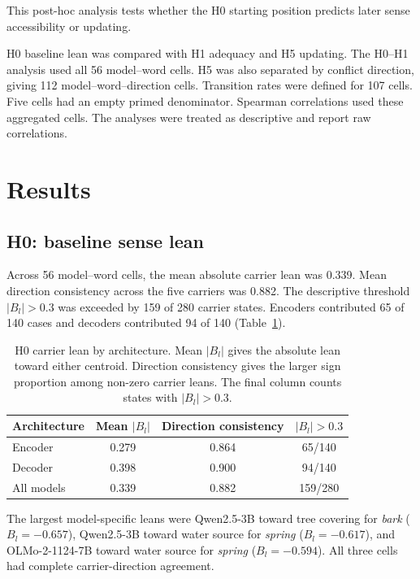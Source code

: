 \documentclass[conference]{IEEEtran}
\newcommand{\resultstableformat}{%
  \footnotesize
  \renewcommand{\arraystretch}{1.12}%
  \setlength{\extrarowheight}{0.7pt}%
}
\begin{document}
This post-hoc analysis tests whether the H0 starting position predicts later
sense accessibility or updating.

H0 baseline lean was compared with H1 adequacy and H5 updating. The
H0--H1 analysis used all 56 model--word cells. H5 was also separated by
conflict direction, giving 112 model--word--direction cells. Transition rates
were defined for 107 cells. Five cells had an empty primed denominator.
Spearman correlations used these aggregated cells. The analyses were treated as descriptive and report raw correlations.

\FloatBarrier
\clearpage
\section{Results}
\label{ch:results}

\subsection{H0: baseline sense lean}
\label{sec:results-h0}

Across 56 model--word cells, the mean absolute carrier lean was 0.339. Mean
direction consistency across the five carriers was 0.882. The descriptive
threshold $|B_l|>0.3$ was exceeded by 159 of 280 carrier states. Encoders
contributed 65 of 140 cases and decoders contributed 94 of 140
(Table~\ref{tab:h0-arch}).

\begin{table}[h]
\centering
\resultstableformat
\caption{H0 carrier lean by architecture. Mean $|B_l|$ gives the absolute lean
toward either centroid. Direction consistency gives the larger sign proportion
among non-zero carrier leans. The final column counts states with
$|B_l|>0.3$.}
\label{tab:h0-arch}
\begin{tabular}{lccc}
\hline
Architecture & Mean $|B_l|$ & Direction consistency & $|B_l|>0.3$ \\
\hline
Encoder & 0.279 & 0.864 & 65/140 \\
Decoder & 0.398 & 0.900 & 94/140 \\
All models & 0.339 & 0.882 & 159/280 \\
\hline
\end{tabular}
\end{table}

The largest model-specific leans were Qwen2.5-3B toward tree covering for
\emph{bark} ($B_l=-0.657$), Qwen2.5-3B toward water source for
\emph{spring} ($B_l=-0.617$), and OLMo-2-1124-7B toward water source for
\emph{spring} ($B_l=-0.594$). All three cells had complete carrier-direction
agreement.
\end{document}
